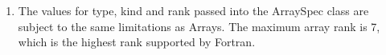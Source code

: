 

\begin{enumerate}

\item The values for type, kind and rank passed into the ArraySpec
class are subject to the same limitations as Arrays.  The maximum
array rank is 7, which is the highest rank supported by Fortran.

\end{enumerate}





